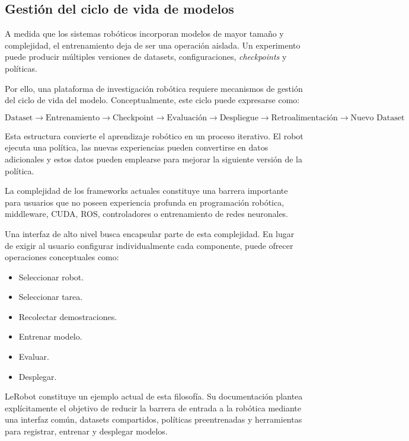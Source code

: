 \documentclass[stu,12pt,floatsintext]{apa7}
\begin{document}
\subsection{Gestión del ciclo de vida de modelos}

A medida que los sistemas robóticos incorporan modelos de mayor tamaño y complejidad, el entrenamiento deja de ser una operación aislada. Un experimento puede producir múltiples versiones de datasets, configuraciones, \textit{checkpoints} y políticas.

Por ello, una plataforma de investigación robótica requiere mecanismos de gestión del ciclo de vida del modelo. Conceptualmente, este ciclo puede expresarse como:

\begin{equation}
\text{Dataset}
\rightarrow
\text{Entrenamiento}
\rightarrow
\text{Checkpoint}
\rightarrow
\text{Evaluación}
\rightarrow
\text{Despliegue}
\rightarrow
\text{Retroalimentación}
\rightarrow
\text{Nuevo Dataset}
\end{equation}

Esta estructura convierte el aprendizaje robótico en un proceso iterativo. El robot ejecuta una política, las nuevas experiencias pueden convertirse en datos adicionales y estos datos pueden emplearse para mejorar la siguiente versión de la política.

La complejidad de los frameworks actuales constituye una barrera importante para usuarios que no poseen experiencia profunda en programación robótica, middleware, CUDA, ROS, controladores o entrenamiento de redes neuronales.

Una interfaz de alto nivel busca encapsular parte de esta complejidad. En lugar de exigir al usuario configurar individualmente cada componente, puede ofrecer operaciones conceptuales como:

\begin{itemize}
    \item Seleccionar robot.
    \item Seleccionar tarea.
    \item Recolectar demostraciones.
    \item Entrenar modelo.
    \item Evaluar.
    \item Desplegar.
\end{itemize}

LeRobot constituye un ejemplo actual de esta filosofía. Su documentación plantea explícitamente el objetivo de reducir la barrera de entrada a la robótica mediante una interfaz común, datasets compartidos, políticas preentrenadas y herramientas para registrar, entrenar y desplegar modelos.
\end{document}
